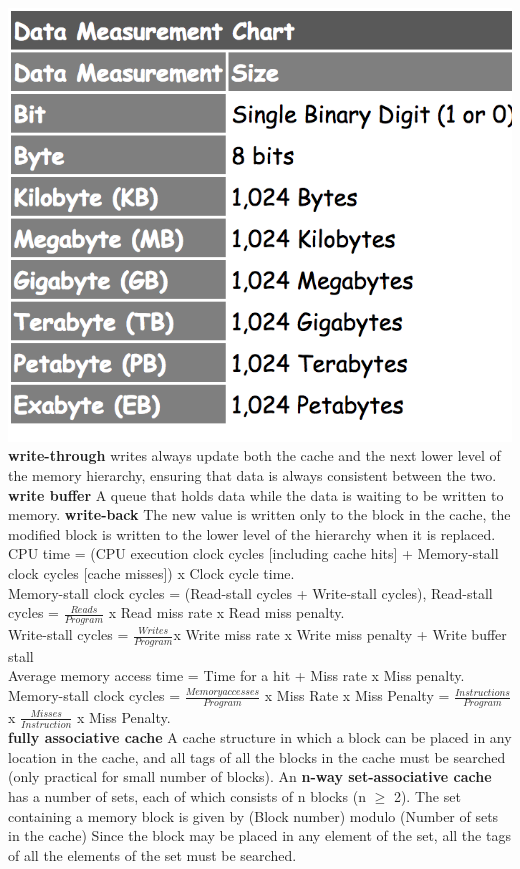 \documentclass[9pt, letterpaper]{article}
\begin{document}
\includegraphics[scale=0.35]{Bytes}\\
\textbf{write-through} writes always update both the cache and the next lower level of the memory hierarchy, ensuring that data is always consistent between the two. \textbf{write buffer} A queue that holds data while the data is waiting to be written to memory. \textbf{write-back} The new value is written only to the block in the cache,  the modified block is written to the lower level of the hierarchy when it is replaced.\\
CPU time = (CPU execution clock cycles [including cache hits] + Memory-stall clock cycles [cache misses]) x Clock cycle time.\\
Memory-stall clock cycles =  (Read-stall cycles  + Write-stall cycles), Read-stall cycles = $\frac{Reads}{Program}$ x Read miss rate x  Read miss penalty.\\
Write-stall cycles = $\frac{Writes}{Program}$x Write miss rate x  Write miss penalty  + Write buffer stall \\
Average memory access time =  Time for a hit + Miss rate x Miss penalty.\\
Memory-stall clock cycles = $\frac{Memory accesses}{Program}$ x Miss Rate x Miss Penalty = $\frac{Instructions}{Program}$ x $\frac{Misses}{Instruction}$ x Miss Penalty.\\
\textbf{fully associative cache} A cache structure in which a block can be placed in any location in the cache,  and all tags of all the blocks in the cache must be searched (only practical for small number of blocks).
An \textbf{n-way set-associative cache} has a number of sets, each of which consists of n blocks (n $\geq$ 2). The set containing a memory block is given by (Block number) modulo (Number of sets in the cache)
Since the block may be placed in any element of the set, all the tags of all the elements of the set must be searched.\\
\end{document}
